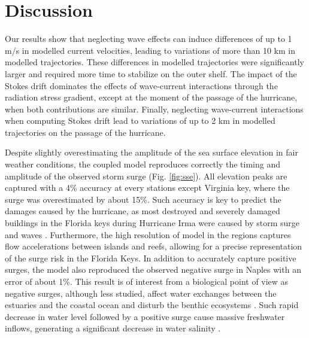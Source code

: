 \documentclass[preprint,12pt,authoryear]{elsarticle}
\begin{document}
\section{Discussion}

Our results show that neglecting wave effects can induce differences of up to 1 m/s in modelled current velocities, leading to variations of more than 10 km in modelled trajectories. These differences in modelled trajectories were significantly larger and required more time to stabilize on the outer shelf. The impact of the Stokes drift dominates the effects of wave-current interactions through the radiation stress gradient, except at  the moment of the passage of the hurricane, when both contributions are similar. Finally, neglecting wave-current interactions when computing Stokes drift lead to variations of up to 2 km in modelled trajectories on the passage of the hurricane.

Despite slightly overestimating the amplitude of the sea surface elevation in fair weather conditions, the coupled model reproduces correctly the timing and amplitude of the observed storm surge (Fig. \ref{fig:sse}). All elevation peaks are captured with a 4\% accuracy at every stations except Virginia key, where the surge was overestimated by about 15\%. Such accuracy is key to predict the damages caused by the hurricane, as most destroyed and severely damaged buildings in the Florida keys during Hurricane Irma were caused by storm surge and waves \citep{xian2018brief}. Furthermore, the high resolution of model in the regions captures flow accelerations between islands and reefs, allowing for a precise representation of the surge risk in the Florida Keys. In addition to accurately capture positive surges, the model also reproduced the observed negative surge in Naples with an error of about 1\%. This result is of interest from a biological point of view as negative surges, although less studied, affect water exchanges between the estuaries and the coastal ocean and disturb the benthic ecosystems \citep{liu2020impacts}. Such rapid decrease in water level followed by a positive surge cause massive freshwater inflows, generating a significant decrease in water salinity \citep{wachnicka2019hurricane}.
\end{document}
